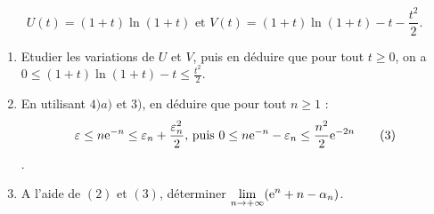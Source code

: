 \begin{description}
\begin{enumerate}
                                    \[
                                    U(t) = (1+t) \ln(1+t)   \text{ et }   V(t) = (1+t) \ln(1+t) - t - \frac{t^2}{2}.
                                    \]
                                    \begin{enumerate}
                                          \item Etudier les variations de $U$ et $V$, 
                                                puis en d\'eduire que pour tout $t \geq 0$, on a 
                                                $0 \leq (1+t) \ln(1+t) - t \leq \frac{t^2}{2}$.
                                          \item En utilisant $4)a)$ et $3)$, en d\'eduire que pour tout $n\geq 1$ : 
                                                $$\varepsilon \leq n \mathrm{e}^{-n} \leq \varepsilon_n + \frac{\varepsilon_n^2}{2}
                                                \text{, puis }
                                                0 \leq n \mathrm{e}^{-n} - \varepsilon_n \leq \frac{n^2}{2} \mathrm{e}^{-2n} \qquad(3)$$.
                                          \item A l'aide de $(2)$ et $(3)$, d\'eterminer 
                                                $\displaystyle{\lim_{n \rightarrow +\infty} (\mathrm{e}^{n} + n - \alpha_n )}$.
                                    \end{enumerate}
                        \end{enumerate}
            \end{description}













































